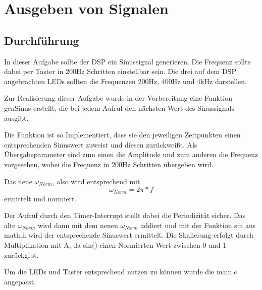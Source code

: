 
\chapter{Ausgeben von Signalen}

\section{Durchf\"uhrung}
In dieser Aufgabe sollte der DSP ein Sinussignal generieren. Die Frequenz sollte 
dabei per Taster in 200Hz Schritten einstellbar sein. 
Die drei auf dem DSP angebrachten LEDs sollten die Frequenzen 200Hz, 400Hz und 4kHz darstellen.

Zur Realisierung dieser Aufgabe wurde in der Vorbereitung eine Funktion genSinus erstellt, 
die bei jedem Aufruf den nächsten Wert des Sinussignals ausgibt.

\begin{adjustbox}{width=\textwidth,keepaspectratio}

\end{adjustbox}\pagebreak

Die Funktion ist so Implementiert, dass sie den jeweiligen Zeitpunkten einen entsprechenden Sinuswert zuweist und diesen zurückweißt. 
Als \"Ubergabeparameter sind zum einen die Amplitude und zum anderen die Frequenz vorgesehen, wobei die Frequenz in 200Hz Schritten \"ubergeben wird. 

Das neue \begin{math}\omega_{Norm}\end{math}, also wird entsprechend mit 
\begin{equation}\label{normierteKreisfrequenz}
 \omega_{Norm}=2\pi*f 
\end{equation}  
ermittelt und normiert.\\\par
Der Aufruf durch den Timer-Interrupt stellt dabei die Periodizität sicher. 
Das alte \begin{math}\omega_{Norm}\end{math} wird dann mit dem neuen \begin{math}\omega_{Norm}\end{math} addiert und mit der Funktion sin aus math.h 
wird der entsprechende Sinuswert ermittelt. Die Skalierung erfolgt durch Multiplikation mit A, da sin() einen Normierten Wert zwischen 0 und 1 zurückgibt.

Um die LEDs und Taster entsprechend nutzen zu können wurde die main.c angepasst.
\begin{adjustbox}{width=\textwidth,keepaspectratio}

\end{adjustbox}\pagebreak

